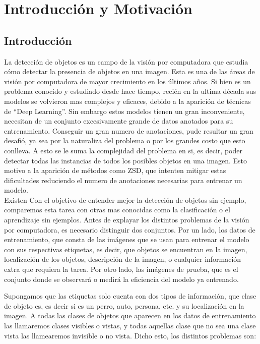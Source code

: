 \chapter{Introducción y Motivación} \label{cap:intro}

\section{Introducción} \label{sec:introduccion}
La detección de objetos es un campo de la visión por computadora que estudia cómo detectar la presencia de objetos en una imagen. Esta es una de las áreas de visión por computadora de mayor crecimiento en los últimos años. Si bien es un problema conocido y estudiado desde hace tiempo, recién en la ultima década sus modelos se volvieron mas complejos y eficaces, debido a la aparición de técnicas  de ``Deep Learning''. Sin embargo estos modelos tienen un gran inconveniente, necesitan de un conjunto excesivamente grande de datos anotados para su entrenamiento. Conseguir un gran numero de anotaciones, pude resultar un gran desafió, ya sea por la naturaliza del problema o por los grandes costo que esto conlleva. A esto se le suma la complejidad del problema en si, es decir, poder detectar todas las instancias de todos los posibles objetos en una imagen. Esto motivo a la aparición de métodos como ZSD, que intenten mitigar estas dificultades reduciendo el numero de anotaciones necesarias para entrenar un modelo.\\

Existen Con el objetivo de entender mejor la detección de objetos sin ejemplo, comparemos esta tarea con otras mas conocidas como la clasificación o el aprendizaje sin ejemplos. Antes de explayar los distintos problemas de la visión por computadora, es necesario distinguir dos conjuntos. Por un lado, los datos de entrenamiento, que consta de las imágenes que se usan para entrenar el modelo con sus respectivas etiquetas, es decir, que objetos se encuentran en la imagen, localización de los objetos, descripción de la imagen, o cualquier información extra que requiera la tarea. Por otro lado, las imágenes de prueba, que es el conjunto donde se observará o medirá la eficiencia del modelo ya entrenado. 

Supongamos que las etiquetas solo cuenta con dos tipos de información, que clase de objeto es, es decir si es un perro, auto, persona, etc. y su localización en la imagen. A todas las clases de objetos que aparecen en los datos de entrenamiento las llamaremos clases visibles o vistas, y todas aquellas clase que no sea una clase vista las llamearemos invisible o no vista. Dicho esto, los distintos problemas son:


